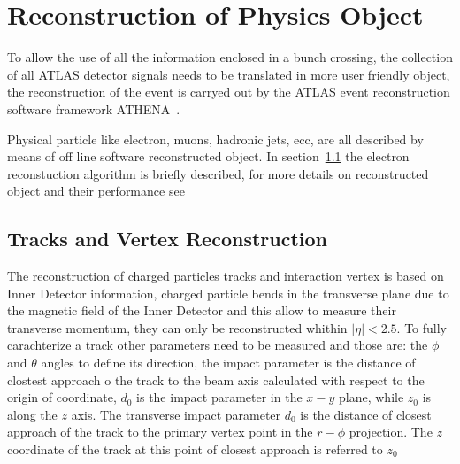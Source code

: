 \chapter{Reconstruction of Physics Object}\label{chap:obj}
\vspace{3cm}
To allow the use of all the information enclosed in a bunch crossing, the collection
of all ATLAS detector signals needs to be translated in more user friendly object, 
the reconstruction of the event is carryed out by the ATLAS event reconstruction 
software framework ATHENA~\cite{Athena}. 

Physical particle like electron, muons, hadronic jets, ecc, are all described by means 
of off line software reconstructed object. In section~\ref{} the electron reconstuction 
algorithm is briefly described,
for more details on reconstructed object and their performance see~\cite{AtlasCSCBook}

\clearpage

\section{Tracks and Vertex Reconstruction}
The reconstruction of charged particles tracks and interaction vertex is based on Inner Detector
information, charged particle bends in the transverse plane due to the magnetic field of the Inner Detector and
this allow to measure their transverse momentum, they can only be reconstructed whithin $|\eta| < 2.5$.
To fully carachterize a track other parameters need to be measured
and those are: the $\phi$ and $\theta$ angles to define its direction, the impact parameter is the 
distance of clostest approach o the track to the beam axis calculated with respect to the origin of coordinate, $d_0$ 
is the impact parameter in the $x-y$ plane,  while $z_0$  is along the $z$ axis.
The transverse impact parameter $d_0$ is the distance of closest approach of the track to the primary vertex
point in the $r-\phi$ projection. The $z$ coordinate of the track at this point of closest approach is referred to $z_0$

